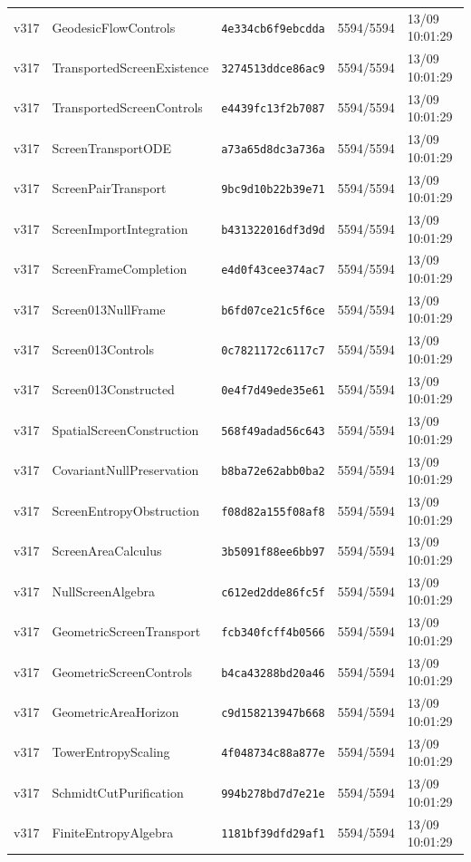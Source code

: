 \documentclass[11pt]{article}
\theoremstyle{definition}\newtheorem{deriv}{Derivation}
\begin{document}
{\begin{longtable}{@{}lllll@{}}
v317 & GeodesicFlowControls & \texttt{4e334cb6f9ebcdda} & 5594/5594 & 13/09 10:01:29 \\
v317 & TransportedScreenExistence & \texttt{3274513ddce86ac9} & 5594/5594 & 13/09 10:01:29 \\
v317 & TransportedScreenControls & \texttt{e4439fc13f2b7087} & 5594/5594 & 13/09 10:01:29 \\
v317 & ScreenTransportODE & \texttt{a73a65d8dc3a736a} & 5594/5594 & 13/09 10:01:29 \\
v317 & ScreenPairTransport & \texttt{9bc9d10b22b39e71} & 5594/5594 & 13/09 10:01:29 \\
v317 & ScreenImportIntegration & \texttt{b431322016df3d9d} & 5594/5594 & 13/09 10:01:29 \\
v317 & ScreenFrameCompletion & \texttt{e4d0f43cee374ac7} & 5594/5594 & 13/09 10:01:29 \\
v317 & Screen013NullFrame & \texttt{b6fd07ce21c5f6ce} & 5594/5594 & 13/09 10:01:29 \\
v317 & Screen013Controls & \texttt{0c7821172c6117c7} & 5594/5594 & 13/09 10:01:29 \\
v317 & Screen013Constructed & \texttt{0e4f7d49ede35e61} & 5594/5594 & 13/09 10:01:29 \\
v317 & SpatialScreenConstruction & \texttt{568f49adad56c643} & 5594/5594 & 13/09 10:01:29 \\
v317 & CovariantNullPreservation & \texttt{b8ba72e62abb0ba2} & 5594/5594 & 13/09 10:01:29 \\
v317 & ScreenEntropyObstruction & \texttt{f08d82a155f08af8} & 5594/5594 & 13/09 10:01:29 \\
v317 & ScreenAreaCalculus & \texttt{3b5091f88ee6bb97} & 5594/5594 & 13/09 10:01:29 \\
v317 & NullScreenAlgebra & \texttt{c612ed2dde86fc5f} & 5594/5594 & 13/09 10:01:29 \\
v317 & GeometricScreenTransport & \texttt{fcb340fcff4b0566} & 5594/5594 & 13/09 10:01:29 \\
v317 & GeometricScreenControls & \texttt{b4ca43288bd20a46} & 5594/5594 & 13/09 10:01:29 \\
v317 & GeometricAreaHorizon & \texttt{c9d158213947b668} & 5594/5594 & 13/09 10:01:29 \\
v317 & TowerEntropyScaling & \texttt{4f048734c88a877e} & 5594/5594 & 13/09 10:01:29 \\
v317 & SchmidtCutPurification & \texttt{994b278bd7d7e21e} & 5594/5594 & 13/09 10:01:29 \\
v317 & FiniteEntropyAlgebra & \texttt{1181bf39dfd29af1} & 5594/5594 & 13/09 10:01:29 \\

\end{longtable}}
\end{document}
